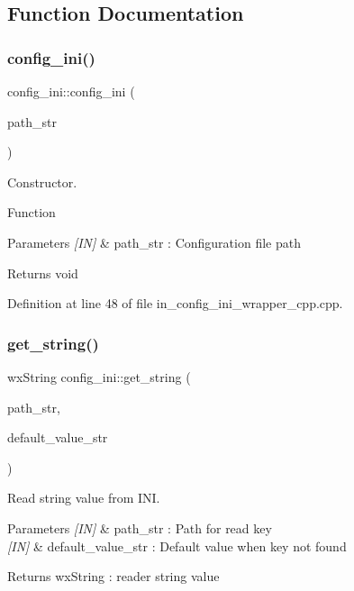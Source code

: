 \subsection{Function Documentation}
\mbox{\label{group__configuration_gae784a11ccf14e018bf31e63f7f3a5fd4}} 
\subsubsection{config\_ini()}
{\footnotesize\ttfamily config\+\_\+ini\+::config\+\_\+ini (\begin{DoxyParamCaption}\item[{wx\+String}]{path\+\_\+str }\end{DoxyParamCaption})}



Constructor. 

Function
\begin{DoxyParams}{Parameters}
{\em \mbox{[}\+I\+N\mbox{]}} & path\+\_\+str \+: Configuration file path \\
\hline
\end{DoxyParams}
\begin{DoxyReturn}{Returns}
void 
\end{DoxyReturn}


Definition at line 48 of file in\+\_\+config\+\_\+ini\+\_\+wrapper\+\_\+cpp.\+cpp.

\mbox{\label{group__configuration_ga7872d25e3c6ebfde43d497484ab6b90e}} 
\subsubsection{get\_string()}
{\footnotesize\ttfamily wx\+String config\+\_\+ini\+::get\+\_\+string (\begin{DoxyParamCaption}\item[{wx\+String}]{path\+\_\+str,  }\item[{wx\+String}]{default\+\_\+value\+\_\+str }\end{DoxyParamCaption})}



Read string value from I\+NI. 


\begin{DoxyParams}{Parameters}
{\em \mbox{[}\+I\+N\mbox{]}} & path\+\_\+str \+: Path for read key \\
\hline
{\em \mbox{[}\+I\+N\mbox{]}} & default\+\_\+value\+\_\+str \+: Default value when key not found \\
\hline
\end{DoxyParams}
\begin{DoxyReturn}{Returns}
wx\+String \+: reader string value 
\end{DoxyReturn}


